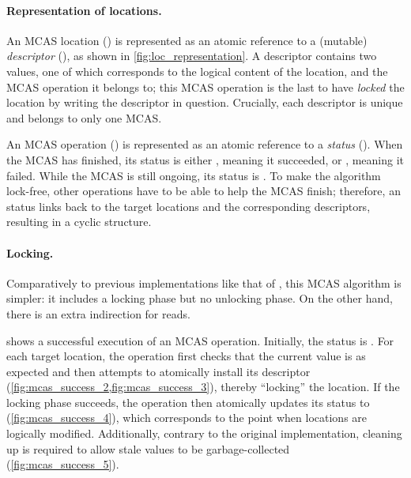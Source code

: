 

\paragraph{Representation of locations.}

An MCAS location () is represented as an atomic reference to a (mutable) \emph{descriptor} (), as shown in \cref{fig:loc_representation}.
A descriptor contains two values, one of which corresponds to the logical content of the location, and the MCAS operation it belongs to; this MCAS operation is the last to have \emph{locked} the location by writing the descriptor in question.
Crucially, each descriptor is unique and belongs to only one MCAS.

An MCAS operation () is represented as an atomic reference to a \emph{status} ().
When the MCAS has finished, its status is either , meaning it succeeded, or , meaning it failed.
While the MCAS is still ongoing, its status is .
To make the algorithm lock-free, other operations have to be able to help the MCAS finish; therefore, an  status links back to the target locations and the corresponding descriptors, resulting in a cyclic structure.




\paragraph{Locking.}

Comparatively to previous implementations like that of \citet{DBLP:conf/wdag/HarrisFP02}, this MCAS algorithm is simpler: it includes a locking phase but no unlocking phase.
On the other hand, there is an extra indirection for reads.

 shows a successful execution of an MCAS operation.
Initially, the status is .
For each target location, the operation first checks that the current value is as expected and then attempts to atomically install its descriptor (\cref{fig:mcas_success_2,fig:mcas_success_3}), thereby ``locking'' the location.
If the locking phase succeeds, the operation then atomically updates its status to  (\cref{fig:mcas_success_4}), which corresponds to the point when locations are logically modified.
Additionally, contrary to the original implementation, cleaning up is required to allow stale values to be garbage-collected (\cref{fig:mcas_success_5}).


